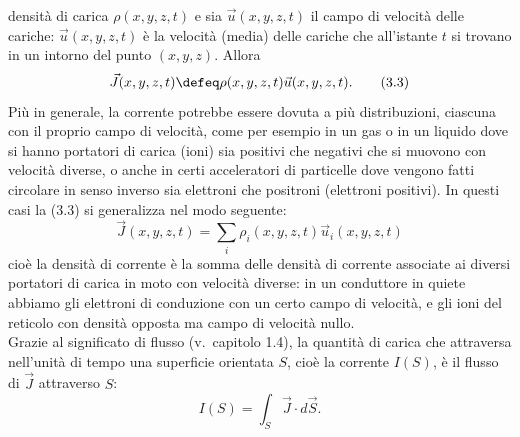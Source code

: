 densit\`a di carica $\rho(x,y,z,t)$ e sia $\vec u(x,y,z,t)$ il campo di
velocit\`a delle cariche: $\vec u(x,y,z,t)$ \`e la velocit\`a (media) delle
cariche che all'istante $t$ si trovano in un intorno del punto $(x,y,z)$. Allora
\begin{equation}
  \vec J(x,y,z,t)\defeq\rho(x,y,z,t)\vec u(x,y,z,t).
  \tag{3.3}
\end{equation}
Pi\`u in generale, la corrente potrebbe essere dovuta a pi\`u distribuzioni,
ciascuna con il proprio campo di velocit\`a, come per esempio in un gas o in un
liquido dove si hanno portatori di carica (ioni) sia positivi che negativi che
si muovono con velocit\`a diverse, o anche in certi acceleratori di particelle
dove vengono fatti circolare in senso inverso sia elettroni che positroni
(elettroni positivi). In questi casi la (3.3) si generalizza nel modo seguente:
\begin{equation}
  \vec J(x,y,z,t)=\textstyle\sum_i\rho_i(x,y,z,t)\vec u_i(x,y,z,t)
  \tag{3.3'}
\end{equation}
cio\`e la densit\`a di corrente \`e la somma delle densit\`a di corrente
associate ai diversi portatori di carica in moto con velocit\`a diverse: in un
conduttore in quiete abbiamo
gli elettroni di conduzione con un certo campo di velocit\`a, e gli ioni del
reticolo con densit\`a opposta ma campo di velocit\`a nullo.\\
Grazie al significato di flusso (v.\ capitolo 1.4), la quantit\`a di carica che
attraversa nell'unit\`a di tempo una superficie orientata $S$, cio\`e la
corrente $I(S)$, \`e il flusso di $\vec J$ attraverso $S$:
\begin{equation}
  I(S)=\int_S\vec J\cdot d\vec S.
  \tag{3.4}
\end{equation}

